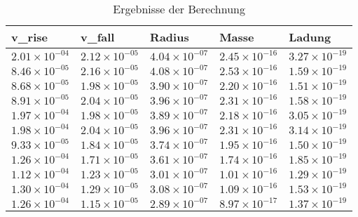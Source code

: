 \begin{table}
\caption{Ergebnisse der Berechnung}
\label{tab:ergebnisse}
\begin{tabular}{lllll}
\toprule
v_rise & v_fall & Radius & Masse & Ladung \\
\midrule
$\mathrm{2.01 \times 10^{-04}}$ & $\mathrm{2.12 \times 10^{-05}}$ & $\mathrm{4.04 \times 10^{-07}}$ & $\mathrm{2.45 \times 10^{-16}}$ & $\mathrm{3.27 \times 10^{-19}}$ \\
$\mathrm{8.46 \times 10^{-05}}$ & $\mathrm{2.16 \times 10^{-05}}$ & $\mathrm{4.08 \times 10^{-07}}$ & $\mathrm{2.53 \times 10^{-16}}$ & $\mathrm{1.59 \times 10^{-19}}$ \\
$\mathrm{8.68 \times 10^{-05}}$ & $\mathrm{1.98 \times 10^{-05}}$ & $\mathrm{3.90 \times 10^{-07}}$ & $\mathrm{2.20 \times 10^{-16}}$ & $\mathrm{1.51 \times 10^{-19}}$ \\
$\mathrm{8.91 \times 10^{-05}}$ & $\mathrm{2.04 \times 10^{-05}}$ & $\mathrm{3.96 \times 10^{-07}}$ & $\mathrm{2.31 \times 10^{-16}}$ & $\mathrm{1.58 \times 10^{-19}}$ \\
$\mathrm{1.97 \times 10^{-04}}$ & $\mathrm{1.98 \times 10^{-05}}$ & $\mathrm{3.89 \times 10^{-07}}$ & $\mathrm{2.18 \times 10^{-16}}$ & $\mathrm{3.05 \times 10^{-19}}$ \\
$\mathrm{1.98 \times 10^{-04}}$ & $\mathrm{2.04 \times 10^{-05}}$ & $\mathrm{3.96 \times 10^{-07}}$ & $\mathrm{2.31 \times 10^{-16}}$ & $\mathrm{3.14 \times 10^{-19}}$ \\
$\mathrm{9.33 \times 10^{-05}}$ & $\mathrm{1.84 \times 10^{-05}}$ & $\mathrm{3.74 \times 10^{-07}}$ & $\mathrm{1.95 \times 10^{-16}}$ & $\mathrm{1.50 \times 10^{-19}}$ \\
$\mathrm{1.26 \times 10^{-04}}$ & $\mathrm{1.71 \times 10^{-05}}$ & $\mathrm{3.61 \times 10^{-07}}$ & $\mathrm{1.74 \times 10^{-16}}$ & $\mathrm{1.85 \times 10^{-19}}$ \\
$\mathrm{1.12 \times 10^{-04}}$ & $\mathrm{1.23 \times 10^{-05}}$ & $\mathrm{3.01 \times 10^{-07}}$ & $\mathrm{1.01 \times 10^{-16}}$ & $\mathrm{1.29 \times 10^{-19}}$ \\
$\mathrm{1.30 \times 10^{-04}}$ & $\mathrm{1.29 \times 10^{-05}}$ & $\mathrm{3.08 \times 10^{-07}}$ & $\mathrm{1.09 \times 10^{-16}}$ & $\mathrm{1.53 \times 10^{-19}}$ \\
$\mathrm{1.26 \times 10^{-04}}$ & $\mathrm{1.15 \times 10^{-05}}$ & $\mathrm{2.89 \times 10^{-07}}$ & $\mathrm{8.97 \times 10^{-17}}$ & $\mathrm{1.37 \times 10^{-19}}$ \\

\end{tabular}
\end{table}
